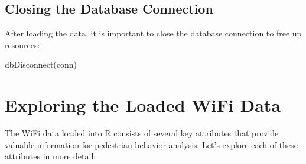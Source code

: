 \documentclass[
  letterpaper,
]{scrbook}
\newenvironment{Shaded}{\begin{snugshade}}{\end{snugshade}}
\newcommand{\FunctionTok}[1]{\textcolor[rgb]{0.28,0.35,0.67}{#1}}
\newcommand{\NormalTok}[1]{\textcolor[rgb]{0.00,0.23,0.31}{#1}}
\begin{document}
\subsection{Closing the Database
Connection}\label{closing-the-database-connection}

After loading the data, it is important to close the database connection
to free up resources:

\begin{Shaded}
\begin{Highlighting}[]
\FunctionTok{dbDisconnect}\NormalTok{(conn)}
\end{Highlighting}
\end{Shaded}

\section{Exploring the Loaded WiFi
Data}\label{exploring-the-loaded-wifi-data}

The WiFi data loaded into R consists of several key attributes that
provide valuable information for pedestrian behavior analysis. Let's
explore each of these attributes in more detail:
\end{document}
